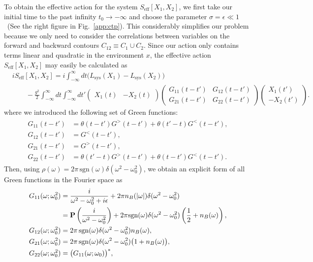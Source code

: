 \documentclass[a4paper,11pt]{article}
\begin{document}
\medskip
To obtain the effective action for the system 
$S_{\mathrm{eff}} [X_1,X_2]$, 
we first take our initial time to 
the past infinity $t_0 \to -\infty$ and choose the parameter 
$\sigma = \epsilon \ll 1$~(See the right figure in Fig.~\ref{app:ctp}). 
This considerably simplifies our problem 
because we only need to consider the correlations between variables on 
the forward and backward contours $C_{12} \equiv C_1 \cup C_2$. Since our action only contains terms linear and quadratic in the environment $x$, the effective action $S_{\mathrm{eff}} [X_1,X_2]$ may easily be calculated as
\begin{align}
\nonumber 
& iS_{\mathrm{eff}}[X_1,X_2] 
= i \int_{-\infty}^\infty dt \big(L_{\mathrm{sys}} (X_1) -L_{\mathrm{sys}} (X_2)\big)
\\
& \quad\quad - \frac{g^2}{2} \int_{-\infty}^\infty dt \int_{-\infty}^\infty dt' 
  \left(\begin{array}{cc}X_1(t) & -X_2(t)\end{array}\right)\left(\begin{array}{cc}G_{11} (t-t') & G_{12} (t-t') \\G_{21} (t-t') & G_{22} (t-t')\end{array}\right)\left(\begin{array}{c}X_1(t') \\-X_2(t')\end{array}\right).
  \label{eq:Seff}
\end{align}
where we introduced the following set 
of Green functions:
\begin{align}
\begin{split}
 G_{11}(t- t') &= \theta(t-t') G^> (t-t') + \theta(t'-t) G^< (t-t'),
 \\
 G_{12}(t- t') &= G^{<}(t-t'),
 \\
 G_{21}(t- t') &= G^{>}(t-t'),
 \\
 G_{22}(t- t') &= \theta(t'-t) G^>(t-t') + \theta(t-t') G^<(t-t').
\end{split}
\end{align}
Then, using 
$\rho (\omega) = 2 \pi\,\mathrm{sgn} (\omega) \delta (\omega^2-\omega_0^2)$,
we obtain an explicit form of all Green functions in the Fourier space 
as 
\begin{align}
\begin{split}
 G_{11} (\omega;\omega_0^2)
 &=  \frac{i}{\omega^2-\omega_0^2 + i \epsilon} 
 + 2 \pi n_B (|\omega|) \delta (\omega^2-\omega_0^2)\\
 &=\mathbf{P}\left(\frac{i}{\omega^{2}-\omega_{0}^{2}}\right)
+2\pi{\rm sgn}(\omega)\delta(\omega^{2}-\omega_{0}^{2})\left(\frac{1}{2}+n_B(\omega)\right)  ,
 \\
 G_{12} (\omega;\omega_0^2) 
 &= 2 \pi\,\mathrm{sgn} (\omega) \delta (\omega^2-\omega_0^2) n_B (\omega) ,
 \\
 G_{21} (\omega;\omega_0^2) 
 &= 2 \pi\,\mathrm{sgn} (\omega) \delta (\omega^2-\omega_0^2) 
 \big( 1 + n_B (\omega) \big),
 \\
 G_{22} (\omega;\omega_0^2) &= \big( G_{11} (\omega;\omega_0) \big)^* ,
 \end{split}
 \label{def:Greenfunc}
\end{align}
\end{document}
